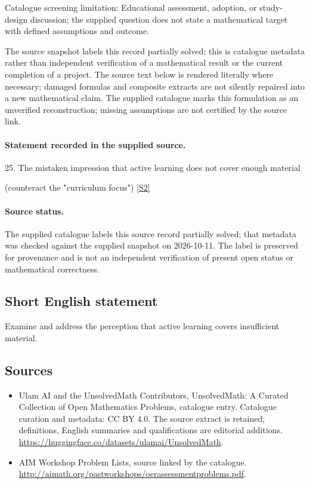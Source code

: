 \documentclass[11pt]{article}
\begin{document}
Catalogue screening limitation: Educational assessment, adoption, or study-design discussion; the supplied question does not state a mathematical target with defined assumptions and outcome.

The source snapshot labels this record partially solved; this is catalogue metadata rather than independent verification of a mathematical result or the current completion of a project.
The source text below is rendered literally where necessary; damaged formulas and composite extracts are not silently repaired into a new mathematical claim.
The supplied catalogue marks this formulation as an unverified reconstruction; missing assumptions are not certified by the source link.
\paragraph{Statement recorded in the supplied source.}
25. The mistaken impression that active learning does not cover enough material

(counteract the "curriculum focus") \href{http://aimath.org/pastworkshops/oerassessmentproblems.pdf}{[S2]}
\paragraph{Source status.}
The supplied catalogue labels this source record partially solved; that metadata was checked against the supplied snapshot on 2026-10-11. The label is preserved for provenance and is not an independent verification of present open status or mathematical correctness.
\subsection{Short English statement}
Examine and address the perception that active learning covers insufficient material.
\subsection{Sources}
\begin{itemize}
\item[S1] Ulam AI and the UnsolvedMath Contributors, UnsolvedMath: A Curated Collection of Open Mathematics Problems, catalogue entry. Catalogue curation and metadata: CC BY 4.0. The source extract is retained; definitions, English summaries and qualifications are editorial additions.
\url{https://huggingface.co/datasets/ulamai/UnsolvedMath}.
\item[S2] AIM Workshop Problem Lists, source linked by the catalogue.
\url{http://aimath.org/pastworkshops/oerassessmentproblems.pdf}.
\end{itemize}
\end{document}
